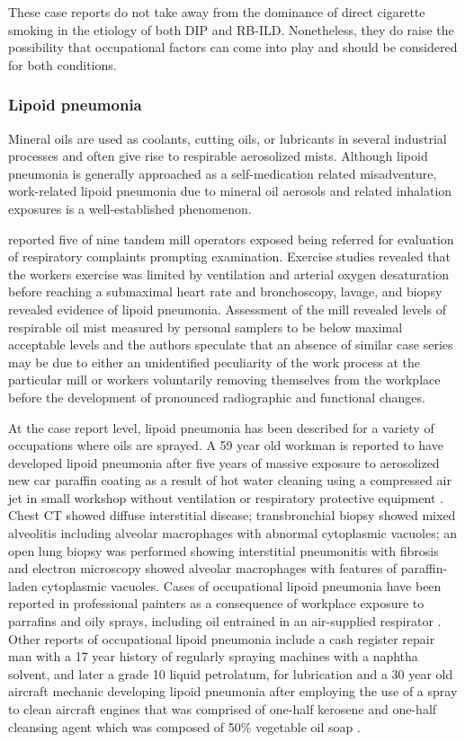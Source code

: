 \documentclass[a4
er,12pt]{article}
\begin{document}
These case reports do not take away from the dominance of direct cigarette smoking in the etiology of both DIP and RB-ILD. Nonetheless, they do raise the possibility that occupational factors can come into play and should be considered for both conditions.

\subsubsection{Lipoid pneumonia}
Mineral oils are used as coolants, cutting oils, or lubricants in several industrial processes and often give rise to respirable aerosolized mists. Although lipoid pneumonia is generally approached as a self-medication related misadventure, work-related lipoid pneumonia due to mineral oil aerosols and related inhalation exposures is a well-established phenomenon.

\cite{Cullen1981}  reported five of nine tandem mill operators exposed being referred for evaluation of respiratory complaints prompting examination. Exercise studies revealed that the workers exercise was limited by ventilation and arterial oxygen desaturation before reaching a submaximal heart rate and bronchoscopy, lavage, and biopsy revealed evidence of lipoid pneumonia. Assessment of the mill revealed levels of respirable oil mist measured by personal samplers to be below maximal acceptable levels and the authors speculate that an absence of similar case series may be due to either an unidentified peculiarity of the work process at the particular mill or workers voluntarily removing themselves from the workplace before the development of pronounced radiographic and functional changes.

At the case report level, lipoid pneumonia has been described for a variety of occupations where oils are sprayed. A 59 year old workman is reported to have developed lipoid pneumonia after five years of massive exposure to aerosolized new car paraffin coating as a result of hot water cleaning using a compressed air jet in small workshop without ventilation or respiratory protective equipment \cite{Pujol1990}. Chest CT showed diffuse interstitial disease; transbronchial biopsy showed mixed alveolitis including alveolar macrophages with abnormal cytoplasmic vacuoles; an open lung biopsy was performed showing interstitial pneumonitis with fibrosis and electron microscopy showed alveolar macrophages with features of paraffin-laden cytoplasmic vacuoles. Cases of occupational lipoid pneumonia have been reported in professional painters as a consequence of workplace exposure to parrafins and oily sprays, including oil entrained in an air-supplied respirator  \cite{AbadFernandez2003, Carby2000}. Other reports of occupational lipoid pneumonia include a cash register repair man with a 17 year history of regularly spraying machines with a naphtha solvent, and later a grade 10 liquid petrolatum, for lubrication \cite{PROUDFIT1950} and a 30 year old aircraft mechanic developing lipoid pneumonia after employing the use of a spray to clean aircraft engines that was comprised of one-half kerosene and one-half cleansing agent which was composed of 50\% vegetable oil soap \cite{FOE1954}.
\end{document}
